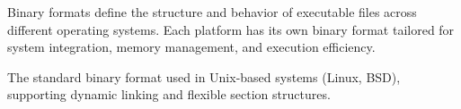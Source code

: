 \begin{NxSSBox}
        \begin{NxIDBox}
                Binary formats define the structure and behavior of executable files across different operating systems. Each platform has its own binary format tailored for system integration, memory management, and execution efficiency.
        \end{NxIDBox}
        \begin{NxIDBoxL}
                 The standard binary format used in Unix-based systems (Linux, BSD), supporting dynamic linking and flexible section structures.
        \end{NxIDBoxL}
\end{NxSSBox}


%
%
